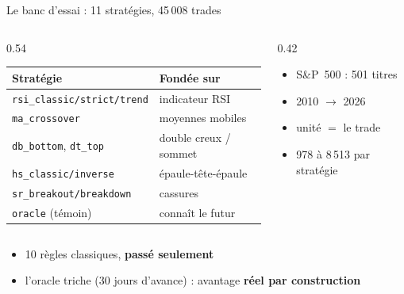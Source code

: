 \documentclass[10pt]{beamer}
\begin{document}
\begin{frame}{Le banc d'essai : 11 stratégies, 45\,008 trades}
  \begin{columns}[T]
    \begin{column}{0.54\textwidth}
      \scriptsize
      \begin{tabular}{@{}ll@{}}
        \toprule
        Stratégie & Fondée sur \\
        \midrule
        \texttt{rsi\_classic/strict/trend} & indicateur RSI \\
        \texttt{ma\_crossover} & moyennes mobiles \\
        \texttt{db\_bottom}, \texttt{dt\_top} & double creux / sommet \\
        \texttt{hs\_classic/inverse} & épaule-tête-épaule \\
        \texttt{sr\_breakout/breakdown} & cassures \\
        \midrule
        \texttt{oracle} (témoin) & \alert{connaît le futur} \\
        \bottomrule
      \end{tabular}
    \end{column}
    \begin{column}{0.42\textwidth}
      \small
      \begin{itemize}\setlength{\itemsep}{2mm}
        \item S\&P~500 : 501 titres
        \item 2010 $\to$ 2026
        \item unité $=$ le trade
        \item 978 à 8\,513 par stratégie
      \end{itemize}
    \end{column}
  \end{columns}
  \vspace{5mm}
  \begin{itemize}\setlength{\itemsep}{3mm}
    \item 10 règles classiques, \textbf{passé seulement}
    \item l'oracle triche (30 jours d'avance) : avantage \textbf{réel par
      construction}
  \end{itemize}
\end{frame}
\end{document}
